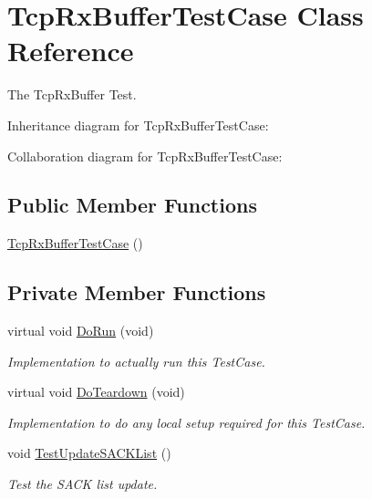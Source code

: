 \hypertarget{classTcpRxBufferTestCase}{}\section{Tcp\+Rx\+Buffer\+Test\+Case Class Reference}
\label{classTcpRxBufferTestCase}


The Tcp\+Rx\+Buffer Test.  




Inheritance diagram for Tcp\+Rx\+Buffer\+Test\+Case\+:


Collaboration diagram for Tcp\+Rx\+Buffer\+Test\+Case\+:
\subsection*{Public Member Functions}
\begin{DoxyCompactItemize}
\item 
\hyperlink{classTcpRxBufferTestCase_ae5876e8a2373e550194e527483ffad14}{Tcp\+Rx\+Buffer\+Test\+Case} ()
\end{DoxyCompactItemize}
\subsection*{Private Member Functions}
\begin{DoxyCompactItemize}
\item 
virtual void \hyperlink{classTcpRxBufferTestCase_a30ae23f4c2f3d18415a55d0ea361fd0b}{Do\+Run} (void)
\begin{DoxyCompactList}\small\item\em Implementation to actually run this Test\+Case. \end{DoxyCompactList}\item 
virtual void \hyperlink{classTcpRxBufferTestCase_a672970bb66f3c8d6e4d181e65252f341}{Do\+Teardown} (void)
\begin{DoxyCompactList}\small\item\em Implementation to do any local setup required for this Test\+Case. \end{DoxyCompactList}\item 
void \hyperlink{classTcpRxBufferTestCase_a56d953233e08dc3b29df3e35f08074c1}{Test\+Update\+S\+A\+C\+K\+List} ()
\begin{DoxyCompactList}\small\item\em Test the S\+A\+CK list update. \end{DoxyCompactList}\end{DoxyCompactItemize}
